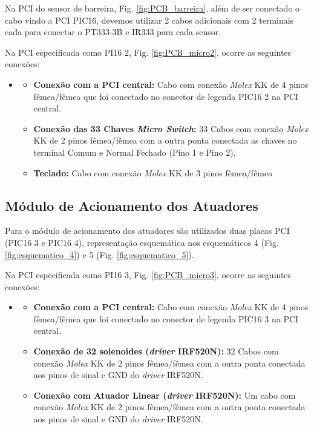 Na PCI do sensor de barreira, Fig. \ref{fig:PCB_barreira}, além de ser conectado o cabo vindo a PCI PIC16, devemos utilizar 2 cabos adicionais com 2 terminais cada para conectar o PT333-3B e IR333 para cada sensor.

Na PCI especificada como PI16 2, Fig. \ref{fig:PCB_micro2}, ocorre as seguintes conexões:

\begin{itemize}
    \item[]
    \begin{itemize}
    \item \textbf{Conexão com a PCI central:} Cabo com conexão \textit{Molex} KK de 4 pinos fêmea/fêmea que foi conectado no conector de legenda PIC16 2 na PCI central.
    \item \textbf{Conexão das 33 Chaves \textit{Micro Switch}:} 33 Cabos com conexão \textit{Molex} KK de 2 pinos fêmea/fêmea com a outra ponta conectada as chaves no terminal Comum e Normal Fechado (Pino 1 e Pino 2).
    \item \textbf{Teclado:} Cabo com conexão \textit{Molex} KK de 3 pinos fêmea/fêmea
\end{itemize}
\end{itemize}

\subsection{Módulo de Acionamento dos Atuadores}

Para o módulo de acionamento dos atuadores são utilizados duas placas PCI (PIC16 3 e PIC16 4), representação esquemática nos esquemáticos 4 (Fig. \ref{fig:esquematico_4}) e 5 (Fig. \ref{fig:esquematico_5}).

Na PCI especificada como PI16 3, Fig. \ref{fig:PCB_micro3}, ocorre as seguintes conexões:

\begin{itemize}
    \item[]
    \begin{itemize}
    \item \textbf{Conexão com a PCI central:} Cabo com conexão \textit{Molex} KK de 4 pinos fêmea/fêmea que foi conectado no conector de legenda PIC16 3 na PCI central.
    \item \textbf{Conexão de 32 solenoides (\textit{driver} IRF520N):} 32 Cabos com conexão \textit{Molex} KK de 2 pinos fêmea/fêmea com a outra ponta conectada aos pinos de sinal e GND do \textit{driver} IRF520N.
    \item \textbf{Conexão com Atuador Linear (\textit{driver} IRF520N):} Um cabo com conexão \textit{Molex} KK de 2 pinos fêmea/fêmea com a outra ponta conectada aos pinos de sinal e GND do \textit{driver} IRF520N.
\end{itemize}
\end{itemize}

